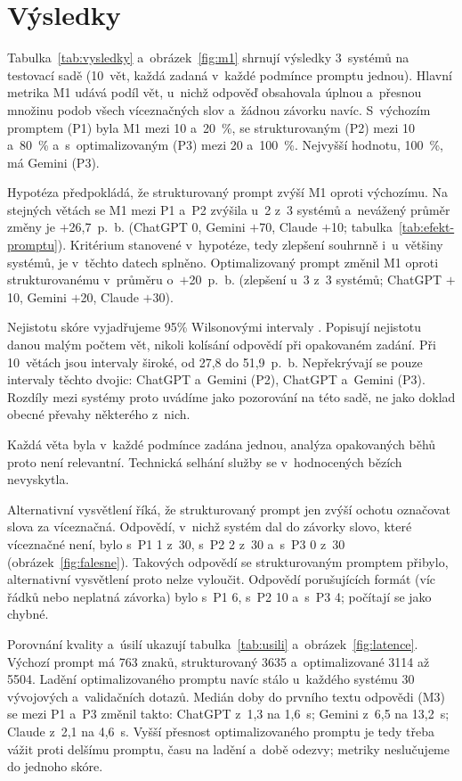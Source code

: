 \section{Výsledky}
\label{sec:vysledky}

Tabulka~\ref{tab:vysledky} a~obrázek~\ref{fig:m1} shrnují výsledky 3~systémů na testovací sadě (10~vět, každá zadaná v~každé podmínce promptu jednou). Hlavní metrika M1 udává podíl vět, u~nichž odpověď obsahovala úplnou a~přesnou množinu podob všech víceznačných slov a~žádnou závorku navíc. S~výchozím promptem (P1) byla M1 mezi 10 a~20~\%, se strukturovaným (P2) mezi 10 a~80~\% a~s~optimalizovaným (P3) mezi 20 a~100~\%. Nejvyšší hodnotu, 100~\%, má Gemini (P3).

Hypotéza předpokládá, že strukturovaný prompt zvýší M1 oproti výchozímu. Na stejných větách se M1 mezi P1 a~P2 zvýšila u~2 z~3 systémů a~nevážený průměr změny je $+$26{,}7~p.~b. (ChatGPT 0, Gemini $+$70, Claude $+$10; tabulka~\ref{tab:efekt-promptu}). Kritérium stanovené v~hypotéze, tedy zlepšení souhrnně i~u~většiny systémů, je v~těchto datech splněno. Optimalizovaný prompt změnil M1 oproti strukturovanému v~průměru o~$+$20~p.~b. (zlepšení u~3 z~3 systémů; ChatGPT $+$10, Gemini $+$20, Claude $+$30).

Nejistotu skóre vyjadřujeme 95\% Wilsonovými intervaly \cite{wilson1927}. Popisují nejistotu danou malým počtem vět, nikoli kolísání odpovědí při opakovaném zadání. Při 10~větách jsou intervaly široké, od 27{,}8 do 51{,}9~p.~b. Nepřekrývají se pouze intervaly těchto dvojic: ChatGPT a~Gemini (P2), ChatGPT a~Gemini (P3). Rozdíly mezi systémy proto uvádíme jako pozorování na této sadě, ne jako doklad obecné převahy některého z~nich.

Každá věta byla v~každé podmínce zadána jednou, analýza opakovaných běhů proto není relevantní. Technická selhání služby se v~hodnocených bězích nevyskytla.

Alternativní vysvětlení říká, že strukturovaný prompt jen zvýší ochotu označovat slova za víceznačná. Odpovědí, v~nichž systém dal do závorky slovo, které víceznačné není, bylo s~P1 1 z~30, s~P2 2 z~30 a~s~P3 0 z~30 (obrázek~\ref{fig:falesne}). Takových odpovědí se strukturovaným promptem přibylo, alternativní vysvětlení proto nelze vyloučit. Odpovědí porušujících formát (víc řádků nebo neplatná závorka) bylo s~P1 6, s~P2 10 a~s~P3 4; počítají se jako chybné.

Porovnání kvality a~úsilí ukazují tabulka~\ref{tab:usili} a~obrázek~\ref{fig:latence}. Výchozí prompt má 763 znaků, strukturovaný 3635 a~optimalizované 3114 až 5504. Ladění optimalizovaného promptu navíc stálo u~každého systému 30 vývojových a~validačních dotazů. Medián doby do prvního textu odpovědi (M3) se mezi P1 a~P3 změnil takto: ChatGPT z~1{,}3 na 1{,}6~s; Gemini z~6{,}5 na 13{,}2~s; Claude z~2{,}1 na 4{,}6~s. Vyšší přesnost optimalizovaného promptu je tedy třeba vážit proti delšímu promptu, času na ladění a~době odezvy; metriky neslučujeme do jednoho skóre.



